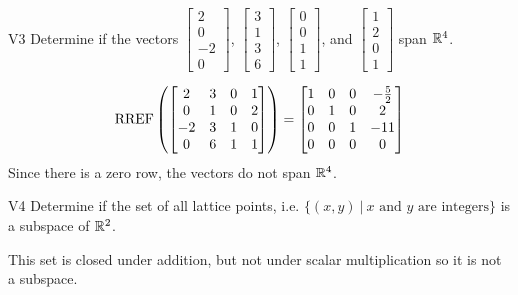 \documentclass{sbgLAexam}
\begin{document}
\begin{extract}\newpage\end{extract}
\begin{problem}{V3}
Determine if the vectors $\begin{bmatrix} 2 \\ 0 \\ -2 \\ 0 \end{bmatrix}$, $\begin{bmatrix} 3 \\ 1 \\ 3 \\ 6 \end{bmatrix}$, $\begin{bmatrix} 0 \\ 0 \\ 1 \\ 1 \end{bmatrix}$, and $\begin{bmatrix}1 \\ 2 \\ 0 \\ 1 \end{bmatrix}$ span $\mathbb{R}^4$.
\end{problem}
\begin{solution}
$$\operatorname{RREF}\left( \begin{bmatrix} 2 & 3 & 0 & 1 \\ 0 & 1 & 0 & 2 \\ -2 & 3 & 1 & 0 \\ 0 & 6 & 1 & 1\end{bmatrix} \right) = \begin{bmatrix}1 & 0 & 0 & -\frac{5}{2} \\ 0 & 1 & 0 & 2 \\ 0 & 0 & 1 & -11\\ 0 & 0 & 0 & 0  \end{bmatrix} $$
Since there is a zero row, the vectors do not span $\mathbb{R}^4$.
\end{solution}

\begin{problem}{V4}
Determine if the set of all lattice points, i.e. $\{(x,y)\ \big|\ \text{$x$ and $y$ are integers} \}$ is a subspace of $\mathbb{R}^2$.
\end{problem}
\begin{solution}
This set is closed under addition, but not under scalar multiplication so it is not a subspace.
\end{solution}
\end{document}
